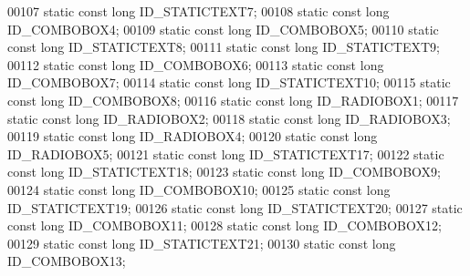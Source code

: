 \begin{DoxyCode}
00107     \textcolor{keyword}{static} \textcolor{keyword}{const} \textcolor{keywordtype}{long} ID_STATICTEXT7;
00108     \textcolor{keyword}{static} \textcolor{keyword}{const} \textcolor{keywordtype}{long} ID_COMBOBOX4;
00109     \textcolor{keyword}{static} \textcolor{keyword}{const} \textcolor{keywordtype}{long} ID_COMBOBOX5;
00110     \textcolor{keyword}{static} \textcolor{keyword}{const} \textcolor{keywordtype}{long} ID_STATICTEXT8;
00111     \textcolor{keyword}{static} \textcolor{keyword}{const} \textcolor{keywordtype}{long} ID_STATICTEXT9;
00112     \textcolor{keyword}{static} \textcolor{keyword}{const} \textcolor{keywordtype}{long} ID_COMBOBOX6;
00113     \textcolor{keyword}{static} \textcolor{keyword}{const} \textcolor{keywordtype}{long} ID_COMBOBOX7;
00114     \textcolor{keyword}{static} \textcolor{keyword}{const} \textcolor{keywordtype}{long} ID_STATICTEXT10;
00115     \textcolor{keyword}{static} \textcolor{keyword}{const} \textcolor{keywordtype}{long} ID_COMBOBOX8;
00116     \textcolor{keyword}{static} \textcolor{keyword}{const} \textcolor{keywordtype}{long} ID_RADIOBOX1;
00117     \textcolor{keyword}{static} \textcolor{keyword}{const} \textcolor{keywordtype}{long} ID_RADIOBOX2;
00118     \textcolor{keyword}{static} \textcolor{keyword}{const} \textcolor{keywordtype}{long} ID_RADIOBOX3;
00119     \textcolor{keyword}{static} \textcolor{keyword}{const} \textcolor{keywordtype}{long} ID_RADIOBOX4;
00120     \textcolor{keyword}{static} \textcolor{keyword}{const} \textcolor{keywordtype}{long} ID_RADIOBOX5;
00121     \textcolor{keyword}{static} \textcolor{keyword}{const} \textcolor{keywordtype}{long} ID_STATICTEXT17;
00122     \textcolor{keyword}{static} \textcolor{keyword}{const} \textcolor{keywordtype}{long} ID_STATICTEXT18;
00123     \textcolor{keyword}{static} \textcolor{keyword}{const} \textcolor{keywordtype}{long} ID_COMBOBOX9;
00124     \textcolor{keyword}{static} \textcolor{keyword}{const} \textcolor{keywordtype}{long} ID_COMBOBOX10;
00125     \textcolor{keyword}{static} \textcolor{keyword}{const} \textcolor{keywordtype}{long} ID_STATICTEXT19;
00126     \textcolor{keyword}{static} \textcolor{keyword}{const} \textcolor{keywordtype}{long} ID_STATICTEXT20;
00127     \textcolor{keyword}{static} \textcolor{keyword}{const} \textcolor{keywordtype}{long} ID_COMBOBOX11;
00128     \textcolor{keyword}{static} \textcolor{keyword}{const} \textcolor{keywordtype}{long} ID_COMBOBOX12;
00129     \textcolor{keyword}{static} \textcolor{keyword}{const} \textcolor{keywordtype}{long} ID_STATICTEXT21;
00130     \textcolor{keyword}{static} \textcolor{keyword}{const} \textcolor{keywordtype}{long} ID_COMBOBOX13;

\end{DoxyCode}
